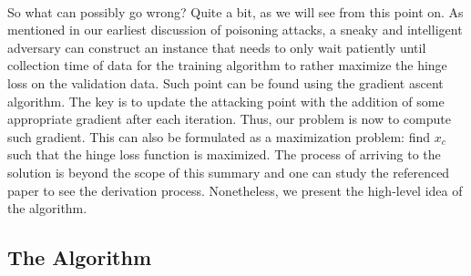\documentclass[twoside]{article}
\begin{document}
\paragraph{}
So what can possibly go wrong? Quite a bit, as we will see from this point on. As mentioned in our earliest discussion of poisoning attacks, a sneaky and intelligent adversary can construct an instance that needs to only wait patiently until collection time of data for the training algorithm to rather maximize the hinge loss on the validation data. Such point can be found using the gradient ascent algorithm. The key is to update the attacking point with the addition of some appropriate gradient after each iteration. Thus, our problem is now to compute such gradient. This can also be formulated as a maximization problem: find $x_c$ such that the hinge loss function is maximized. The process of arriving to the solution is beyond the scope of this summary and one can study the referenced paper to see the derivation process. Nonetheless, we present the high-level idea of the algorithm.
\subsection{The Algorithm}
\end{document}

